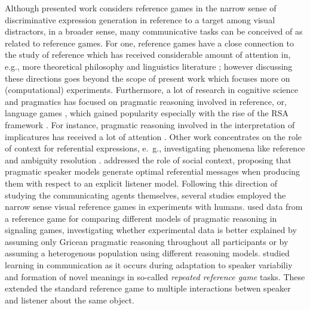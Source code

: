 Although presented work considers reference games in the narrow sense of discriminative expression generation in reference to a target among visual distractors, in a broader sense, many communicative tasks can be conceived of as related to reference games. 
For one, reference games have a close connection to the study of reference which has received considerable amount of attention in, e.g., more theoretical philosophy and linguistics literature \parencite[e.~g., ][]{searle1969speech, krifka2008basic, sep-reference}; however discussing these directions goes beyond the scope of present work which focuses more on (computational) experiments. 
Furthermore, a lot of research in cognitive science and pragmatics has focused on pragmatic reasoning involved in reference, or, language games \parencite[e.~g.,][]{frank2012predicting, wittgenstein2010philosophical}, which gained popularity especially with the rise of the RSA framework \parencite{goodman2016pragmatic}.  
For instance, pragmatic reasoning involved in the interpretation of implicatures has received a lot of attention \parencite[e.~g.,][]{bergen2016pragmatic, rothschild2013game, van2012explaining}.
Other work concentrates on the role of context for referential expressions, e.~g., investigating phenomena like reference and ambiguity resolution \parencite{frank2016rational, potts2016embedded}. \cite{golland2010game} addressed the role of social context, proposing that pragmatic speaker models generate optimal referential messages when producing them with respect to an explicit listener model. 
Following this direction of studying the communicating agents themselves, several studies employed the narrow sense visual reference games in experiments with humans. \cite{franke2016reasoning} used data from a reference game for comparing different models of pragmatic reasoning in signaling games, investigating whether experimental data is better explained by assuming only Gricean pragmatic reasoning throughout all participants or by assuming a heterogenous population using different reasoning models. %
\cite{hawkins2020characterizing} studied learning in communication as it occurs during adaptation to speaker variabiliy and formation of novel meanings in so-called \emph{repeated reference game} tasks. These extended the standard reference game to multiple interactions betwen speaker and listener about the same object. 

